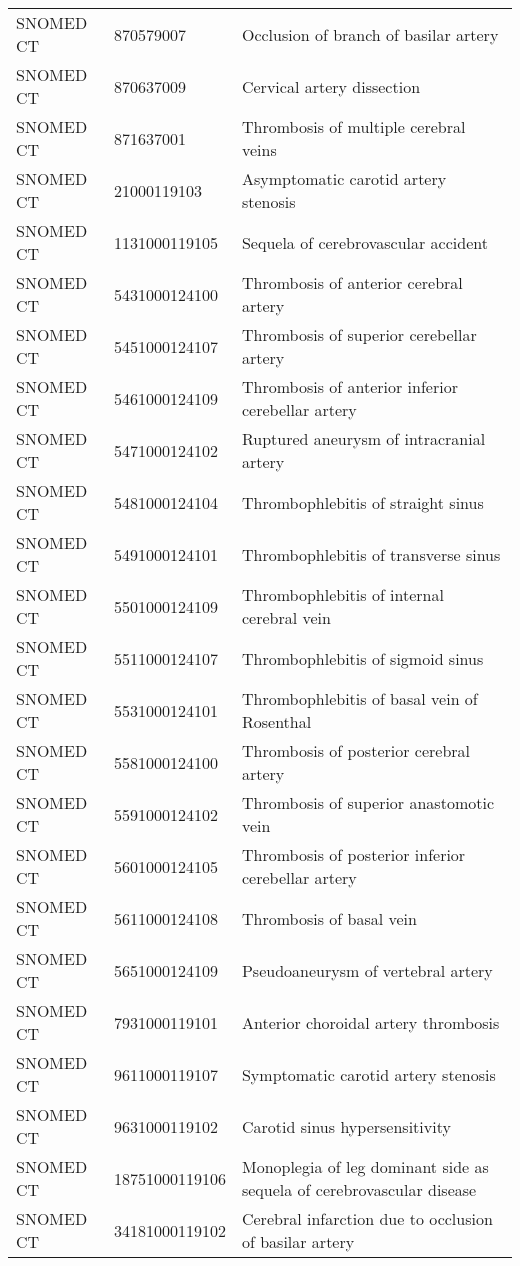 \begin{longtable}{p{}p{}p{}}
  SNOMED CT & 870579007 & Occlusion of branch of basilar artery \\ 
  SNOMED CT & 870637009 & Cervical artery dissection \\ 
  SNOMED CT & 871637001 & Thrombosis of multiple cerebral veins \\ 
  SNOMED CT & 21000119103 & Asymptomatic carotid artery stenosis \\ 
  SNOMED CT & 1131000119105 & Sequela of cerebrovascular accident \\ 
  SNOMED CT & 5431000124100 & Thrombosis of anterior cerebral artery \\ 
  SNOMED CT & 5451000124107 & Thrombosis of superior cerebellar artery \\ 
  SNOMED CT & 5461000124109 & Thrombosis of anterior inferior cerebellar artery \\ 
  SNOMED CT & 5471000124102 & Ruptured aneurysm of intracranial artery \\ 
  SNOMED CT & 5481000124104 & Thrombophlebitis of straight sinus \\ 
  SNOMED CT & 5491000124101 & Thrombophlebitis of transverse sinus \\ 
  SNOMED CT & 5501000124109 & Thrombophlebitis of internal cerebral vein \\ 
  SNOMED CT & 5511000124107 & Thrombophlebitis of sigmoid sinus \\ 
  SNOMED CT & 5531000124101 & Thrombophlebitis of basal vein of Rosenthal \\ 
  SNOMED CT & 5581000124100 & Thrombosis of posterior cerebral artery \\ 
  SNOMED CT & 5591000124102 & Thrombosis of superior anastomotic vein \\ 
  SNOMED CT & 5601000124105 & Thrombosis of posterior inferior cerebellar artery \\ 
  SNOMED CT & 5611000124108 & Thrombosis of basal vein \\ 
  SNOMED CT & 5651000124109 & Pseudoaneurysm of vertebral artery \\ 
  SNOMED CT & 7931000119101 & Anterior choroidal artery thrombosis \\ 
  SNOMED CT & 9611000119107 & Symptomatic carotid artery stenosis \\ 
  SNOMED CT & 9631000119102 & Carotid sinus hypersensitivity \\ 
  SNOMED CT & 18751000119106 & Monoplegia of leg dominant side as sequela of cerebrovascular disease \\ 
  SNOMED CT & 34181000119102 & Cerebral infarction due to occlusion of basilar artery \\ 

\end{longtable}
